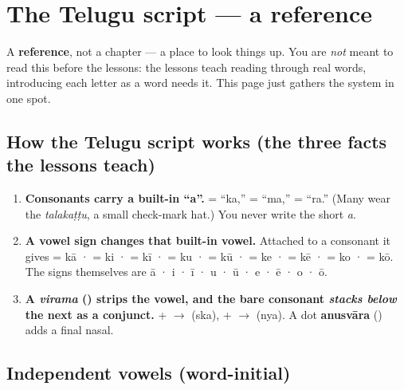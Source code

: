 
\chapter*{The Telugu script --- a reference}

A \textbf{reference}, not a chapter — a place to look things up. You are \emph{not} meant to read this before the lessons: the lessons teach reading through real words, introducing each letter as a word needs it. This page just gathers the system in one spot.

\section*{How the Telugu script works (the three facts the lessons teach)}

\begin{enumerate}
\raggedright
\setlength{\itemsep}{0.35em}
  \item \textbf{Consonants carry a built-in \textquotedblleft{}a\textquotedblright{}.}  = \textquotedblleft{}ka,\textquotedblright{}  = \textquotedblleft{}ma,\textquotedblright{}  = \textquotedblleft{}ra.\textquotedblright{} (Many wear the \emph{talakaṭṭu}, a small check-mark hat.) You never write the short \emph{a}.
  \item \textbf{A vowel sign changes that built-in vowel.} Attached to a consonant it gives  = kā ·  = ki ·  = kī ·  = ku ·  = kū ·  = ke ·  = kē ·  = ko ·  = kō. The signs themselves are \textbf{} ā · \textbf{} i · \textbf{} ī · \textbf{} u · \textbf{} ū · \textbf{} e · \textbf{} ē · \textbf{} o · \textbf{} ō.
  \item \textbf{A \emph{virama} () strips the vowel, and the bare consonant \emph{stacks below} the next as a conjunct.}  +  $\to$  (ska),  +  $\to$  (nya). A dot \textbf{anusvāra} () adds a final nasal.
\end{enumerate}

\section*{Independent vowels (word-initial)}

